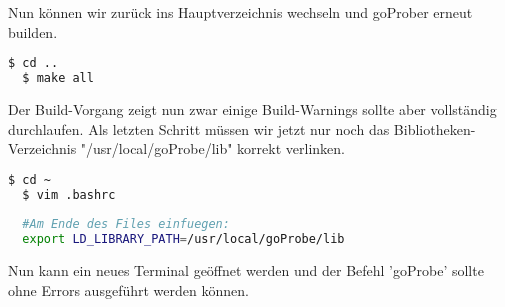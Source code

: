 Nun können wir zurück ins Hauptverzeichnis wechseln und goProber erneut builden.

\begin{lstlisting}[language=bash]
  $ cd ..
  $ make all
\end{lstlisting}

Der Build-Vorgang zeigt nun zwar einige Build-Warnings sollte aber vollständig durchlaufen. Als letzten Schritt müssen wir jetzt nur noch das Bibliotheken-Verzeichnis "/usr/local/goProbe/lib" korrekt verlinken.

\begin{lstlisting}[language=bash]
  $ cd ~
  $ vim .bashrc
  
  #Am Ende des Files einfuegen:
  export LD_LIBRARY_PATH=/usr/local/goProbe/lib
\end{lstlisting}

Nun kann ein neues Terminal geöffnet werden und der Befehl 'goProbe' sollte ohne Errors ausgeführt werden können.
